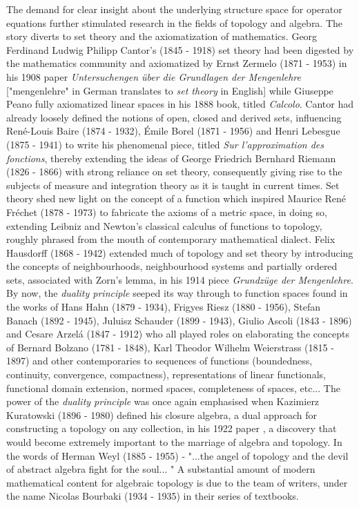 \documentclass[12pt, oneside]{book}
\begin{document}
\noindent The demand for clear insight about the underlying structure space for operator equations further stimulated research in the fields of topology and algebra. The story diverts to set theory and the axiomatization of mathematics. Georg Ferdinand Ludwig Philipp Cantor's (1845 - 1918) set theory had been digested by the mathematics community and axiomatized by Ernst Zermelo (1871 - 1953) in his 1908 paper \textit{Untersuchengen \"uber die Grundlagen der Mengenlehre} ["mengenlehre" in German translates to \textit{set theory} in English] while Giuseppe Peano fully axiomatized linear spaces in his 1888 book, titled \textit{Calcolo}. Cantor had already loosely defined the notions of open, closed and derived sets, influencing Ren\'e-Louis Baire (1874 - 1932), \'Emile Borel (1871 - 1956) and Henri Lebesgue (1875 - 1941) to write his phenomenal piece, titled \textit{Sur l'approximation des fonctions}, thereby extending the ideas of George Friedrich Bernhard Riemann (1826 - 1866) with strong reliance on set theory, consequently giving rise to the subjects of measure and integration theory as it is taught in current times.
\vskip 0.3cm
\noindent Set theory shed new light on the concept of a function which inspired Maurice Ren\'e Fr\'echet (1878 - 1973) to fabricate the axioms of a metric space, in doing so, extending Leibniz and Newton's classical calculus of functions to topology, roughly phrased from the mouth of contemporary mathematical dialect. Felix Hausdorff (1868 - 1942) extended much of topology and set theory by introducing the concepts of neighbourhoods, neighbourhood systems and partially ordered sets, associated with Zorn's lemma, in his 1914 piece \textit{Grundzüge der Mengenlehre}. By now, the \textit{duality principle} seeped its way through to function spaces found in the works of Hans Hahn (1879 - 1934), Frigyes Riesz (1880 - 1956), Stefan Banach (1892 - 1945), Juluisz Schauder (1899 - 1943), Giulio Ascoli (1843 - 1896) and Cesare Arzel\'a (1847 - 1912) who all played roles on elaborating the concepts of Bernard Bolzano (1781 - 1848), Karl Theodor Wilhelm Weierstrass (1815 - 1897) and other contemporaries to sequences of functions (boundedness, continuity, convergence, compactness), representations of linear functionals, functional domain extension, normed spaces, completeness of spaces, etc...
\vskip 0.3cm
\noindent The power of the \textit{duality principle} was once again emphasised when Kazimierz Kuratowski (1896 - 1980) defined his closure algebra, a dual approach for constructing a topology on any collection, in his 1922 paper \cite{KK}, a discovery that would become extremely important to the marriage of algebra and topology. In the words of Herman Weyl (1885 - 1955) - "...the angel of topology and the devil of abstract algebra fight for the soul... " A substantial amount of modern mathematical content for algebraic topology is due to the team of writers, under the name Nicolas Bourbaki (1934 - 1935) in their series of textbooks. 
\end{document}
